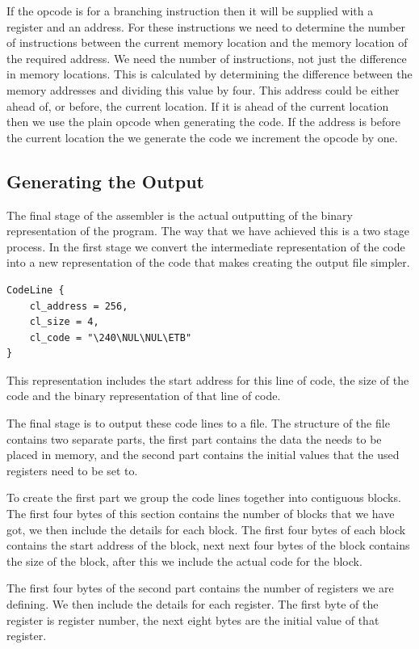 \documentclass[a4paper,11pt]{report}
\begin{document}
If the opcode is for a branching instruction then it will be supplied with a register and an address. For these instructions we need to determine the number of instructions between the current memory location and the memory location of the required address. We need the number of instructions, not just the difference in memory locations. This is calculated by determining the difference between the memory addresses and dividing this value by four. This address could be either ahead of, or before, the current location. If it is ahead of the current location then we use the plain opcode when generating the code. If the address is before the current location the we generate the code we increment the opcode by one.
\subsection{Generating the Output}
The final stage of the assembler is the actual outputting of the binary representation of the program. The way that we have achieved this is a two stage process. In the first stage we convert the intermediate representation of the code into a new representation of the code that makes creating the output file simpler.

\begin{lstlisting}[basicstyle=\ttfamily\small]
CodeLine {
	cl_address = 256, 
	cl_size = 4, 
	cl_code = "\240\NUL\NUL\ETB"
}
\end{lstlisting}

This representation includes the start address for this line of code, the size of the code and the binary representation of that line of code.

The final stage is to output these code lines to a file. The structure of the file contains two separate parts, the first part contains the data the needs to be placed in memory, and the second part contains the initial values that the used registers need to be set to.

To create the first part we group the code lines together into contiguous blocks. The first four bytes of this section contains the number of blocks that we have got, we then include the details for each block. The first four bytes of each block contains the start address of the block, next next four bytes of the block contains the size of the block, after this we include the actual code for the block.

The first four bytes of the second part contains the number of registers we are defining. We then include the details for each register. The first byte of the register is register number, the next eight bytes are the initial value of that register.
\end{document}
